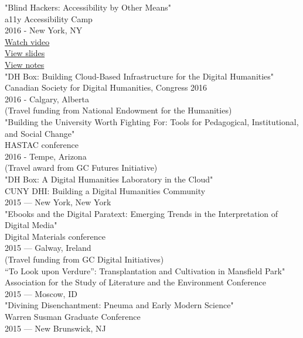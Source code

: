 \documentclass[11pt]{article}
\begin{document}
"Blind Hackers: Accessibility by Other Means"\\
a11y Accessibility Camp\\
2016 - New York, NY\\
\href{https://www.youtube.com/watch?v=W8_O3joo4aU}{Watch video}\\
\href{http://htmlpreview.github.io/?https://github.com/smythp/blind-hackers/blob/master/presentation/foo.html}{View slides}\\
\href{https://github.com/smythp/blind-hackers}{View notes}\\

"DH Box: Building Cloud-Based Infrastructure for the Digital Humanities"\\
Canadian Society for Digital Humanities, Congress 2016\\
2016 - Calgary, Alberta\\
(Travel funding from National Endowment for the Humanities)\\

"Building the University Worth Fighting For: Tools for Pedagogical, Institutional, and Social Change"\\
HASTAC conference\\
2016 - Tempe, Arizona\\
(Travel award from GC Futures Initiative)\\

"DH Box: A Digital Humanities Laboratory in the Cloud"\\
CUNY DHI: Building a Digital Humanities Community\\
2015 — New York, New York\\

"Ebooks and the Digital Paratext: Emerging Trends in the Interpretation of Digital Media"\\
Digital Materials conference\\
2015 — Galway, Ireland\\
(Travel funding from GC Digital Initiatives)\\

“To Look upon Verdure”: Transplantation and Cultivation in Mansfield Park"\\
Association for the Study of Literature and the Environment Conference\\
2015 — Moscow, ID\\

"Divining Disenchantment: Pneuma and Early Modern Science"\\
Warren Susman Graduate Conference\\
2015 — New Brunswick, NJ\\
\end{document}
